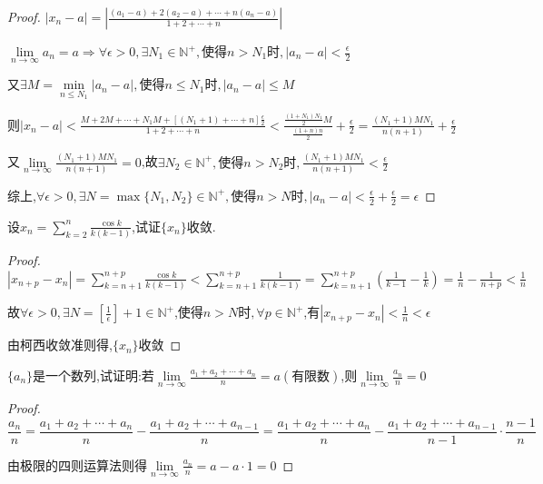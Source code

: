 \begin{proof}
    $|x_n-a|=|\frac{(a_1-a)+2(a_2-a)+\cdots+n(a_n-a)}{1+2+\cdots+n}|$

    $\lim \limits_{n \to \infty} a_n=a \Longrightarrow \forall \epsilon>0,\exists N_1\in \mathbb{N}^+,\mbox{使得}n>N_1\mbox{时},|a_n-a|<\frac{\epsilon}{2}$

    又$\exists M= \underset{n\le N_1}{\min} |a_n-a| ,\mbox{使得}n\le N_1\mbox{时},|a_n-a|\le M$

    则$|x_n-a|<\frac{M+2M+\cdots+N_1M+[(N_1+1)+\cdots+n]\frac{\epsilon}{2}}{1+2+\cdots+n}
        <\frac{\frac{(1+N_1)N_1}{2}M}{\frac{(1+n)n}{2}}+\frac{\epsilon}{2}
        =\frac{(N_1+1)MN_1}{n(n+1)}+\frac{\epsilon}{2}$

    又$\lim \limits_{n \to \infty} \frac{(N_1+1)MN_1}{n(n+1)}=0$,故$\exists N_2 \in \mathbb{N}^+,\mbox{使得}n>N_2\mbox{时},\frac{(N_1+1)MN_1}{n(n+1)}<\frac{\epsilon}{2}$

    综上,$\forall \epsilon>0,\exists N=\max \{ N_1,N_2\}\in \mathbb{N}^+,\mbox{使得}n>N\mbox{时},|a_n-a|<\frac{\epsilon}{2}+\frac{\epsilon}{2}=\epsilon$
\end{proof}

\begin{exercise}
    设$x_n=\sum\limits_{k=2}^{n} \frac{\cos k}{k(k-1)}$,试证$\{x_n\}$收敛.
\end{exercise}

\begin{proof}

    $|x_{n+p}-x_n|=\sum\limits_{k=n+1}^{n+p} \frac{\cos k}{k(k-1)}
    <\sum\limits_{k=n+1}^{n+p} \frac{1}{k(k-1)}
    =\sum\limits_{k=n+1}^{n+p} (\frac{1}{k-1}-\frac{1}{k})=\frac{1}{n}-\frac{1}{n+p}
    <\frac{1}{n}$

    故$\forall \epsilon>0,\exists N=[\frac{1}{\epsilon}]+1\in \mathbb{N}^+$,使得$n>N\mbox{时},\forall p\in \mathbb{N}^+$,有$|x_{n+p}-x_n|<\frac{1}{n}<\epsilon$

    由柯西收敛准则得,$\{x_n\}$收敛
\end{proof}

\begin{exercise}
    $\{a_n\}$是一个数列,试证明:若$\lim \limits_{n \to \infty} \frac{a_1+a_2+\cdots+a_n}{n}=a(\mbox{有限数})$,则$\lim \limits_{n \to \infty} \frac{a_n}{n}=0$
\end{exercise}

\begin{proof}
    $$\frac{a_n}{n}=\frac{a_1+a_2+\cdots+a_n}{n}-\frac{a_1+a_2+\cdots+a_{n-1}}{n}
    =\frac{a_1+a_2+\cdots+a_n}{n}-\frac{a_1+a_2+\cdots+a_{n-1}}{n-1}\cdot \frac{n-1}{n}$$

    由极限的四则运算法则得$\lim \limits_{n \to \infty} \frac{a_n}{n}=a-a\cdot 1=0$
\end{proof}

